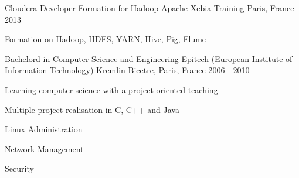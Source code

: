 

\begin{cventries}

  \cventry
    {Cloudera Developer Formation for Hadoop Apache} %
    {Xebia Training}
    {Paris, France} %
    {2013} %
    {
      \begin{cvitems} %
        \item {Formation on Hadoop, HDFS, YARN, Hive, Pig, Flume}
      \end{cvitems}
    }
  \cventry
    {Bachelord in Computer Science and Engineering} %
    {Epitech (European Institute of Information Technology)} %
    {Kremlin Bicetre, Paris, France} %
    {2006 - 2010} %
    {
      \begin{cvitems} %
        \item {Learning computer science with a project oriented teaching}
        \item {Multiple project realisation in C, C++ and Java}
        \item {Linux Administration}
        \item {Network Management}
        \item {Security}
      \end{cvitems}
    }

\end{cventries}
